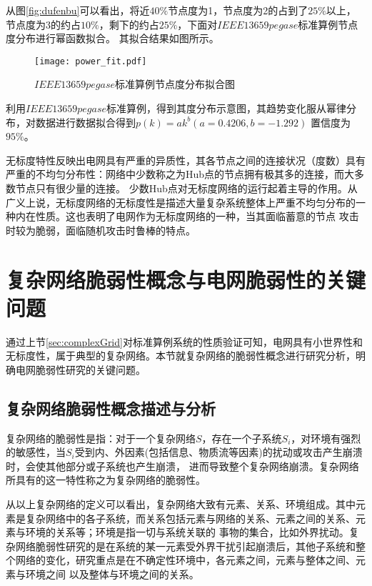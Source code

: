 从图\ref{fig:dufenbu}可以看出，将近$40\%$节点度为1，节点度为2的占到了$25\%$以上，节点度为3的约占$10\%$，剩下的约占$25\%$，下面对$IEEE13659pegase$标准算例节点度分布进行幂函数拟合。
其拟合结果如图所示。
\begin{figure}[H] %
  \centering
  \texttt{[image: power\_fit.pdf]}
  \caption{$IEEE13659pegase$标准算例节点度分布拟合图}
  \label{fig:fower_fit}
\end{figure}

利用$IEEE13659pegase$标准算例，得到其度分布示意图，其趋势变化服从幂律分布，对数据进行数据拟合得到$p(k)=a k^{b}(a=0.4206, b=-1.292)$ 置信度为$95\%$。

无标度特性反映出电网具有严重的异质性，其各节点之间的连接状况（度数）具有严重的不均匀分布性：网络中少数称之为Hub点的节点拥有极其多的连接，而大多数节点只有很少量的连接。
少数Hub点对无标度网络的运行起着主导的作用。从广义上说，无标度网络的无标度性是描述大量复杂系统整体上严重不均匀分布的一种内在性质。这也表明了电网作为无标度网络的一种，当其面临蓄意的节点
攻击时较为脆弱，面临随机攻击时鲁棒的特点。

\section{复杂网络脆弱性概念与电网脆弱性的关键问题}
\label{sec:load}
通过上节\ref{sec:complexGrid}对标准算例系统的性质验证可知，电网具有小世界性和无标度性，属于典型的复杂网络。本节就复杂网络的脆弱性概念进行研究分析，明确电网脆弱性研究的关键问题。

\subsection{复杂网络脆弱性概念描述与分析}
\label{sec:loadEffect}
复杂网络的脆弱性是指：对于一个复杂网络$S$，存在一个子系统$S_i$，对环境有强烈的敏感性，当$S_i$受到内、外因素(包括信息、物质流等因素)的扰动或攻击产生崩溃时，会使其他部分或子系统也产生崩溃，
进而导致整个复杂网络崩溃\cite{refs31}。复杂网络所具有的这一特性称之为复杂网络的脆弱性。

从以上复杂网络的定义可以看出，复杂网络大致有元素、关系、环境组成。其中元素是复杂网络中的各子系统，而关系包括元素与网络的关系、元素之间的关系、元素与环境的关系等；环境是指一切与系统关联的
事物的集合，比如外界扰动。复杂网络脆弱性研究的是在系统的某一元素受外界干扰引起崩溃后，其他子系统和整个网络的变化，研究重点是在不确定性环境中，各元素之间，元素与整体之间、元素与环境之间
以及整体与环境之间的关系。

